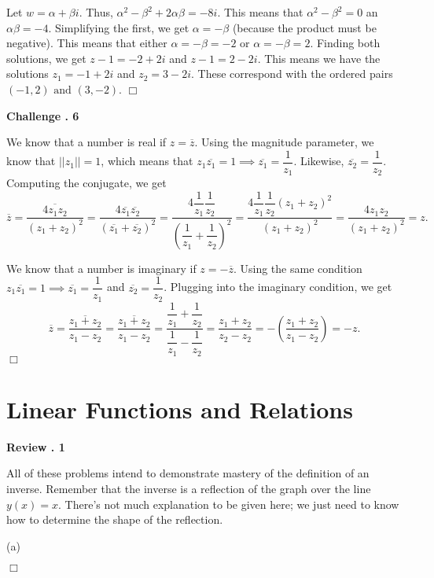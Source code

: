 \documentclass[lang=en,11pt]{elegantbook}
\begin{document}
Let $w=\alpha+\beta i$.  Thus, $\alpha^2-\beta^2+2\alpha\beta=-8i.$  This means that $\alpha^2-\beta^2=0$ an $\alpha\beta=-4$.  Simplifying the first, we get $\alpha=-\beta$ (because the product must be negative).  This means that either $\alpha=-\beta=-2$ or $\alpha=-\beta=2$.  Finding both solutions, we get $z-1=-2+2i$ and $z-1=2-2i$.  This means we have the solutions $z_1=-1+2i$ and $z_2=3-2i$.  These correspond with the ordered pairs $\boxed{(-1,2) \text{ and } (3,-2)}$. $\Box$\vspace{3mm}

\noindent \textbf{Challenge . 6}

We know that a number is real if $z=\overline{z}$.  Using the magnitude parameter, we know that $||z_1||=1$, which means that $z_1\overline{z_1}=1 \implies \overline{z_1}=\dfrac{1}{z_1}$.  Likewise, $\overline{z_2}=\dfrac{1}{z_2}$. Computing the conjugate, we get $$\overline{z}=\overline{\dfrac{4z_1z_2}{\left(z_1+z_2\right)^2}}=\dfrac{4\overline{z_1}\overline{z_2}}{(\overline{z_1}+\overline{z_2})^2}=\dfrac{4\dfrac{1}{z_1}\dfrac{1}{z_2}}{\left(\dfrac{1}{z_1}+\dfrac{1}{z_2}\right)^2}=\dfrac{4\dfrac{1}{z_1}\dfrac{1}{z_2}(z_1+z_2)^2}{(z_1+z_2)^2}=\dfrac{4z_1z_2}{\left(z_1+z_2\right)^2}=\boxed{z}.$$

We know that a number is imaginary if $z=-\overline{z}$.  Using the same condition $z_1\overline{z_1}=1 \implies \overline{z_1}=\dfrac{1}{z_1}$ and $\overline{z_2}=\dfrac{1}{z_2}$.  Plugging into the imaginary condition, we get $$\overline{z}=\overline{\dfrac{z_1+z_2}{z_1-z_2}}=\overline{\dfrac{z_1+z_2}{z_1-z_2}}=\dfrac{\dfrac{1}{z_1}+\dfrac{1}{z_2}}{\dfrac{1}{z_1}-\dfrac{1}{z_2}}=\dfrac{z_1+z_2}{z_2-z_2}=-\left(\dfrac{z_1+z_2}{z_1-z_2}\right)=\boxed{-z}.$$ $\Box$

\chapter{Linear Functions and Relations}

\noindent \textbf{Review . 1}

All of these problems intend to demonstrate mastery of the definition of an inverse.  Remember that the inverse is a reflection of the graph over the line $y(x)=x$.  There's not much explanation to be given here; we just need to know how to determine the shape of the reflection.

(a) \begin{figure}[!ht]
    \centering
\end{figure} $\Box$\vspace{3mm}
\end{document}
